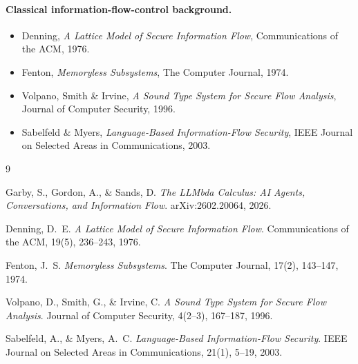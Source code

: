 \documentclass[11pt, a4paper]{article}
\begin{document}
\paragraph{Classical information-flow-control background.}
\begin{itemize}
  \item Denning, \emph{A Lattice Model of Secure Information Flow},
    Communications of the ACM, 1976.
  \item Fenton, \emph{Memoryless Subsystems}, The Computer Journal, 1974.
  \item Volpano, Smith \& Irvine, \emph{A Sound Type System for Secure
    Flow Analysis}, Journal of Computer Security, 1996.
  \item Sabelfeld \& Myers, \emph{Language-Based Information-Flow
    Security}, IEEE Journal on Selected Areas in Communications, 2003.
\end{itemize}

\begin{thebibliography}{9}

Garby, S., Gordon, A., \& Sands, D.
\newblock \emph{The LLMbda Calculus: AI Agents, Conversations, and
Information Flow}.
\newblock arXiv:2602.20064, 2026.

Denning, D.~E.
\newblock \emph{A Lattice Model of Secure Information Flow}.
\newblock Communications of the ACM, 19(5), 236--243, 1976.

Fenton, J.~S.
\newblock \emph{Memoryless Subsystems}.
\newblock The Computer Journal, 17(2), 143--147, 1974.

Volpano, D., Smith, G., \& Irvine, C.
\newblock \emph{A Sound Type System for Secure Flow Analysis}.
\newblock Journal of Computer Security, 4(2--3), 167--187, 1996.

Sabelfeld, A., \& Myers, A.~C.
\newblock \emph{Language-Based Information-Flow Security}.
\newblock IEEE Journal on Selected Areas in Communications, 21(1), 5--19, 2003.

\end{thebibliography}
\end{document}
